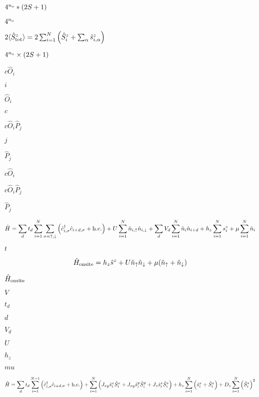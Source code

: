 \documentclass{article}
\begin{document}
$ 4^{n_{\rm o}}*(2S+1)$
\pagebreak

$ 4^{n_{\rm o}}$
\pagebreak

$ 2\langle\hat{S}^{z}_{\rm tot}\rangle = 2\sum^{N}_{i=1}\left(\hat{S}^{z}_{i} + \sum_{\alpha}\hat{s}^{z}_{i,\alpha}\right)$
\pagebreak

$ 4^{n_{\rm o}}\times (2S + 1) $
\pagebreak

$ c\hat{O}_{i} $
\pagebreak

$ i $
\pagebreak

$ \hat{O}_{i} $
\pagebreak

$ c $
\pagebreak

$ c\hat{O}_{i}\hat{P}_{j} $
\pagebreak

$ j$
\pagebreak

$ \hat{P}_{j} $
\pagebreak

$ c\hat{O}_{i}$
\pagebreak

$ c\hat{O}_{i}\hat{P}_{j}$
\pagebreak

$ \hat{P}_{j}$
\pagebreak

\[ \hat{H}=\sum_{d}t_{d}\sum^{N}_{i=1}\sum_{\sigma=\uparrow,\downarrow} \left(\hat{c}^{\dagger}_{i,\sigma}\hat{c}_{i+d,\sigma}+{\rm h.c.}\right)+ U\sum^{N}_{i=1}\hat{n}_{i,\uparrow}\hat{n}_{i,\downarrow}+ \sum_{d}V_{d}\sum^{N}_{i=1}\hat{n}_{i}\hat{n}_{i+d}+ h_z\sum^{N}_{i=1}s^{z}_{i} + \mu\sum^{N}_{i=1}\hat{n}_{i} \]
\pagebreak

$ t $
\pagebreak

\[ \hat{H}_{\rm onsite}=h_z\hat{s}^{z}+U\hat{n}_{\uparrow}\hat{n}_{\downarrow}+\mu(\hat{n}_{\uparrow}+\hat{n}_{\downarrow})\]
\pagebreak

$ \hat{H}_{\rm onsite}$
\pagebreak

$ V $
\pagebreak

$ t_{d} $
\pagebreak

$ d $
\pagebreak

$ V_{d} $
\pagebreak

$ U $
\pagebreak

$ h_z $
\pagebreak

$ mu $
\pagebreak

\[ \hat{H}=\sum_{d}t_{d}\sum^{N-1}_{i=1}\left(\hat{c}^{\dagger}_{i,\sigma}\hat{c}_{i+d,\sigma}+{\rm h.c.}\right)+ \sum^{N}_{i=1}\left(J_{xy}\hat{s}^{x}_{i}\hat{S}^{x}_{i}+J_{xy}\hat{s}^{y}_{i}\hat{S}^{y}_{i}+J_{z}\hat{s}^{z}_{i}\hat{S}^{z}_{i}\right) + h_z\sum^{N}_{i=1}\left(\hat{s}^{x}_{i} + \hat{S}^{x}_{i}\right) + D_z\sum^{N}_{i=1}\left(\hat{S}^{z}_{i}\right)^2 \]
\pagebreak
\end{document}

